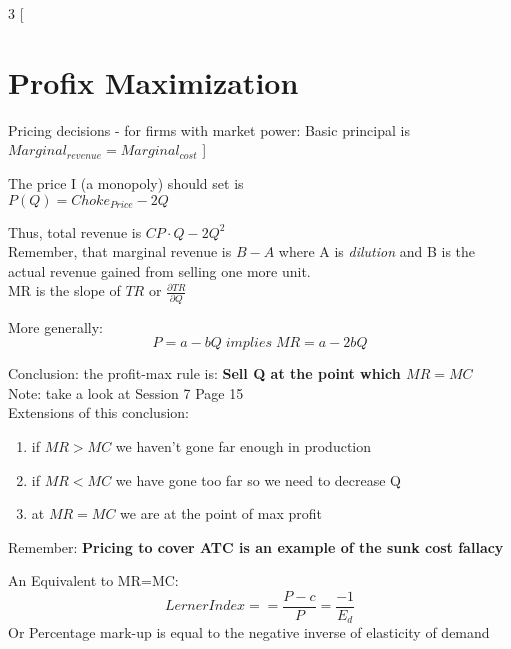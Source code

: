 \documentclass[8pt]{report}
\begin{document}
\begin{multicols}{3}
[
\section{Profix Maximization}
Pricing decisions - for firms with market power: Basic principal is $Marginal_{revenue} = Marginal_{cost}$
]

The price I (a monopoly) should set is \\
$P(Q) = Choke_{Price} - 2Q$

Thus, total revenue is $CP \cdot Q - 2Q^2$ \\
Remember, that marginal revenue is $B-A$ where A is \textit{dilution} and B is the actual revenue gained from selling one more unit. \\

MR is the slope of $TR$ or $\frac{\partial TR} {\partial Q}$

More generally: 
$$
	P = a-bQ \; implies \; MR = a - 2bQ
$$

Conclusion: the profit-max rule is: \textbf{Sell Q at the point which $MR=MC$} \\
Note: take a look at Session 7 Page 15 \\
Extensions of this conclusion:
\begin{enumerate}
\item if $MR > MC$ we haven't gone far enough in production
\item if $MR < MC$ we have gone too far so we need to decrease Q
\item at $MR = MC$ we are at the point of max profit
\end{enumerate}

Remember: \textbf{Pricing to cover ATC is an example of the sunk cost fallacy}

An Equivalent to MR=MC: \\
$$
	Lerner Index == \frac{P-c}{P} = \frac{-1}{E_d} 
$$ Or Percentage mark-up is equal to the negative inverse of elasticity of demand \\

\end{multicols}
\end{document}
